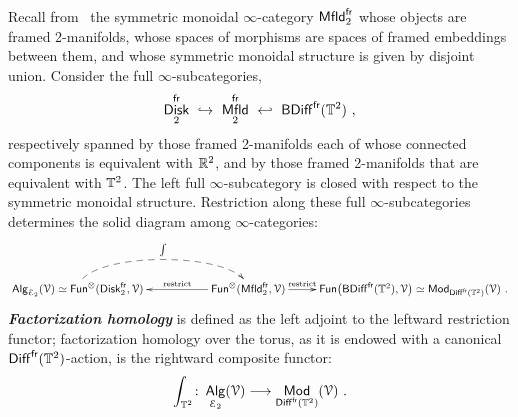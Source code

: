 \documentclass{amsart}
\theoremstyle{definition}
\theoremstyle{remark}
\DeclareMathOperator{\Alg}{\sf Alg}
\DeclareMathOperator{\Mod}{\sf Mod}
\DeclareMathOperator{\Fun}{{\sf Fun}}
\newcommand{\bit}[1]{\textbf{\textit{#1}}}
\DeclareMathOperator{\Diff}{{\sf Diff}}
\DeclareMathOperator{\Mfld}{{\sf Mfld}}
\DeclareMathOperator{\Disk}{{\sf Disk}}
\DeclareMathOperator{\fr}{\sf fr}
\def\ot{\otimes}
\def\cE{\mathcal E}\def\cF{\mathcal F}\def\cG{\mathcal G}\def\cH{\mathcal H}
\begin{document}
Recall from~\cite{old.fact} the symmetric monoidal $\infty$-category $\Mfld^{\fr}_2$ whose objects are framed 2-manifolds, whose spaces of morphisms are spaces of framed embeddings between them, and whose symmetric monoidal structure is given by disjoint union.
Consider the full $\infty$-subcategories,
\begin{equation}
\label{t73}
\Disk^{\fr}_2 
~\hookrightarrow ~
\Mfld^{\fr}_2 
~\hookleftarrow ~
{\sf BDiff}^{\fr}(\TT^2)
~,
\end{equation}
respectively spanned by those framed 2-manifolds each of whose connected components is equivalent with $\mathbb R^2$, and by those framed 2-manifolds that are equivalent with $\mathbb T^2$.
The left full $\infty$-subcategory is closed with respect to the symmetric monoidal structure.
Restriction along these full $\infty$-subcategories determines the solid diagram among $\infty$-categories:
\begin{equation}
\label{e75}
\xymatrix{
\Alg_{\cE_2}(\cV)
\simeq
\Fun^{\ot}(\Disk_2^{\fr} , \cV )
\ar@{-->}@(u,u)[rr]^-{\int}
&&
\Fun^{\ot}(\Mfld_2^{\fr} , \cV)
\ar[r]^-{\rm restrict}
\ar[ll]_-{\rm restrict}
&
\Fun\bigl({\sf BDiff}^{\fr}(\TT^2) , \cV \bigr)
\simeq
\Mod_{\Diff^{\fr}(\TT^2)}(\cV)
~.
}
\end{equation}
\bit{Factorization homology} is defined as the left adjoint to the leftward restriction functor; 
factorization homology over the torus, as it is endowed with a canonical $\Diff^{\fr}(\TT^2)$-action, is the rightward composite functor:
\begin{equation}
\label{e74}
\int_{\TT^2}
\colon
\Alg_{\cE_2}(\cV)
\longrightarrow
\Mod_{\Diff^{\fr}(\TT^2)}(\cV)
~.
\end{equation}
\end{document}
